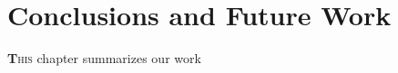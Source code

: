 \chapter{Conclusions and Future Work}

\lettrine[lines=3]{\textbf{T}}{his} chapter summarizes our work 